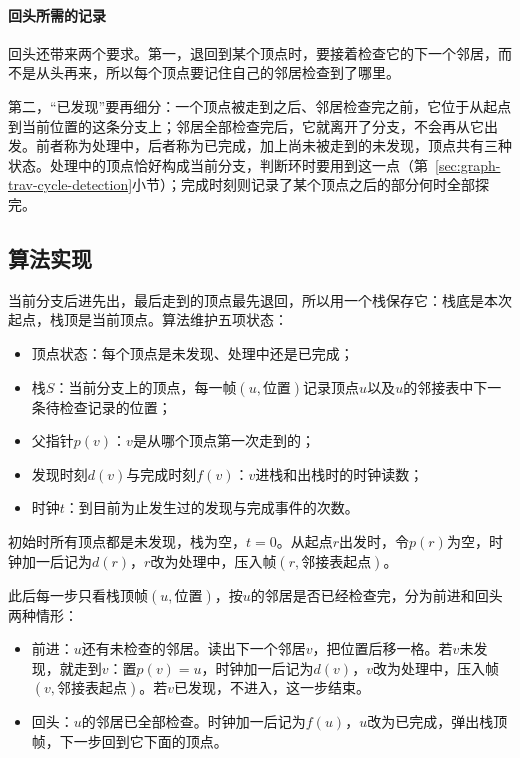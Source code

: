 \paragraph{回头所需的记录}
回头还带来两个要求。第一，退回到某个顶点时，要接着检查它的下一个邻居，而不是从头再来，所以每个顶点要记住自己的邻居检查到了哪里。

第二，“已发现”要再细分：一个顶点被走到之后、邻居检查完之前，它位于从起点到当前位置的这条分支上；邻居全部检查完后，它就离开了分支，不会再从它出发。前者称为处理中，后者称为已完成，加上尚未被走到的未发现，顶点共有三种状态。处理中的顶点恰好构成当前分支，判断环时要用到这一点（第~\ref{sec:graph-trav-cycle-detection}小节）；完成时刻则记录了某个顶点之后的部分何时全部探完。

\subsection{算法实现}
\label{sec:graph-trav-dfs-stack}

当前分支后进先出，最后走到的顶点最先退回，所以用一个栈保存它：栈底是本次起点，栈顶是当前顶点。算法维护五项状态：
\begin{itemize}
  \item 顶点状态：每个顶点是未发现、处理中还是已完成；
  \item 栈$S$：当前分支上的顶点，每一帧$(u,\text{位置})$记录顶点$u$以及$u$的邻接表中下一条待检查记录的位置；
  \item 父指针$p(v)$：$v$是从哪个顶点第一次走到的；
  \item 发现时刻$d(v)$与完成时刻$f(v)$：$v$进栈和出栈时的时钟读数；
  \item 时钟$t$：到目前为止发生过的发现与完成事件的次数。
\end{itemize}

初始时所有顶点都是未发现，栈为空，$t=0$。从起点$r$出发时，令$p(r)$为空，时钟加一后记为$d(r)$，$r$改为处理中，压入帧$(r,\text{邻接表起点})$。

此后每一步只看栈顶帧$(u,\text{位置})$，按$u$的邻居是否已经检查完，分为前进和回头两种情形：
\begin{itemize}
  \item 前进：$u$还有未检查的邻居。读出下一个邻居$v$，把位置后移一格。若$v$未发现，就走到$v$：置$p(v)=u$，时钟加一后记为$d(v)$，$v$改为处理中，压入帧$(v,\text{邻接表起点})$。若$v$已发现，不进入，这一步结束。
  \item 回头：$u$的邻居已全部检查。时钟加一后记为$f(u)$，$u$改为已完成，弹出栈顶帧，下一步回到它下面的顶点。
\end{itemize}

